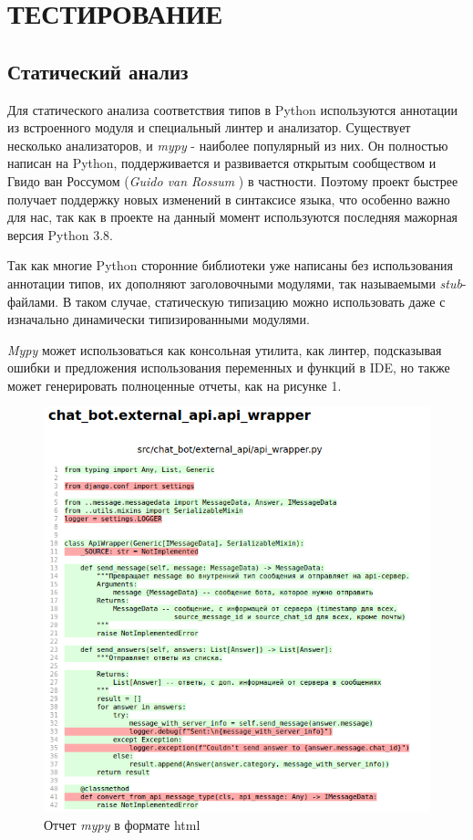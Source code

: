 \section{ТЕСТИРОВАНИЕ}
    \subsection{Статический анализ}
    Для статического анализа соответствия типов в Python используются аннотации 
    из встроенного модуля  и специальный линтер и анализатор.
    Существует несколько анализаторов,
    и \textit{mypy} \cite{docs.mypy} - наиболее популярный из них.
    Он полностью написан на Python, поддерживается и развивается открытым
    сообществом 
    и Гвидо ван Россумом (\textit{Guido van Rossum} \cite{guido.van.rossum})
    в частности. Поэтому проект быстрее получает поддержку новых изменений в
    синтаксисе языка, что особенно важно для нас, так как в проекте на данный
    момент используются последняя мажорная версия Python 3.8.

    Так как многие Python сторонние библиотеки уже написаны без использования
    аннотации типов, их дополняют заголовочными модулями,
    так называемыми \textit{stub}-файлами. В таком случае, статическую типизацию
    можно использовать даже с изначально динамически типизированными модулями.
    
    \textit{Mypy} может использоваться как консольная утилита,
    как линтер, подсказывая ошибки и предложения использования переменных и 
    функций в IDE, 
    но также может генерировать полноценные отчеты, как на рисунке 1.
    \begin{figure}[H]
        \centering
        \includegraphics[width=0.7\linewidth]{static/mypy-report.png}
        \caption{Отчет \textit{mypy} в формате html}
        \label{fig:mypy-report}
    \end{figure}
    
